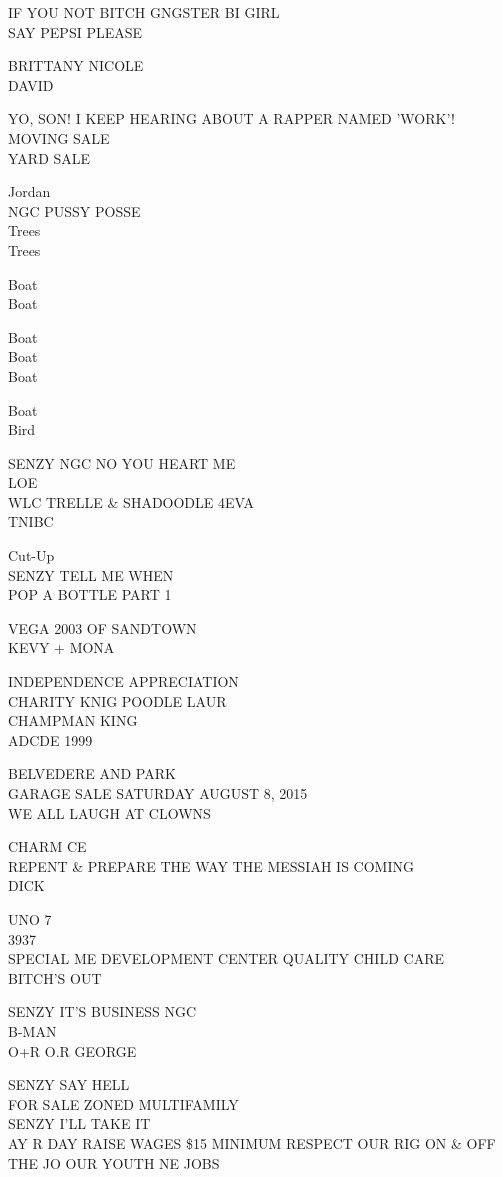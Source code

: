 \documentclass[10pt,letterpaper]{article}
\begin{document}
IF YOU NOT BITCH GNGSTER BI GIRL\\
SAY PEPSI PLEASE

BRITTANY NICOLE\\
DAVID

YO, SON!  I KEEP HEARING ABOUT A RAPPER NAMED 'WORK'!\\
MOVING SALE\\
YARD SALE

Jordan\\
NGC PUSSY POSSE\\
Trees\\
Trees

Boat\\
Boat

Boat\\
Boat\\
Boat

Boat\\
Bird

SENZY NGC NO YOU HEART ME\\
LOE\\
WLC TRELLE \& SHADOODLE 4EVA\\
TNIBC

Cut{-}Up\\
SENZY TELL ME WHEN\\
POP A BOTTLE PART 1

VEGA 2003 OF SANDTOWN\\
KEVY + MONA

INDEPENDENCE APPRECIATION\\
CHARITY KNIG POODLE LAUR\\
CHAMPMAN KING\\
ADCDE 1999

BELVEDERE AND PARK\\
GARAGE SALE SATURDAY AUGUST 8, 2015\\
WE ALL LAUGH AT CLOWNS

CHARM CE\\
REPENT \& PREPARE THE WAY THE MESSIAH IS COMING\\
DICK

UNO 7\\
3937\\
SPECIAL ME DEVELOPMENT CENTER QUALITY CHILD CARE\\
BITCH'S OUT

SENZY IT'S BUSINESS NGC\\
B{-}MAN\\
O+R O.R GEORGE

SENZY SAY HELL\\
FOR SALE ZONED MULTIFAMILY\\
SENZY I'LL TAKE IT\\
AY R DAY RAISE WAGES \$15 MINIMUM RESPECT OUR RIG ON \& OFF THE JO OUR YOUTH NE JOBS
\end{document}
